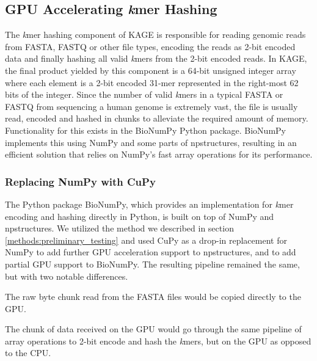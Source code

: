 \subsection{GPU Accelerating \textit{k}mer Hashing} \label{methods:gpu_accelerating_kmer_hashing}
The \textit{k}mer hashing component of KAGE is responsible for reading genomic reads from FASTA, FASTQ or other file types, encoding the reads as 2-bit encoded data and finally hashing all valid \textit{k}mers from the 2-bit encoded reads.
In KAGE, the final product yielded by this component is a 64-bit unsigned integer array where each element is a 2-bit encoded 31-mer represented in the right-most 62 bits of the integer.
Since the number of valid \textit{k}mers in a typical FASTA or FASTQ from sequencing a human genome is extremely vast, the file is usually read, encoded and hashed in chunks to alleviate the required amount of memory.
Functionality for this exists in the BioNumPy Python package.
BioNumPy implements this using NumPy and some parts of npstructures, resulting in an efficient solution that relies on NumPy's fast array operations for its performance.

\subsubsection{Replacing NumPy with CuPy}
The Python package BioNumPy, which provides an implementation for \textit{k}mer encoding and hashing directly in Python, is built on top of NumPy and npstructures.
We utilized the method we described in section \ref{methods:preliminary_testing} and used CuPy as a drop-in replacement for NumPy to add further GPU acceleration support to npstructures, and to add partial GPU support to BioNumPy.
The resulting pipeline remained the same, but with two notable differences.
\begin{compactenum}
  \item The raw byte chunk read from the FASTA files would be copied directly to the GPU.
  \item The chunk of data received on the GPU would go through the same pipeline of array operations to 2-bit encode and hash the \textit{k}mers, but on the GPU as opposed to the CPU.
\end{compactenum}


